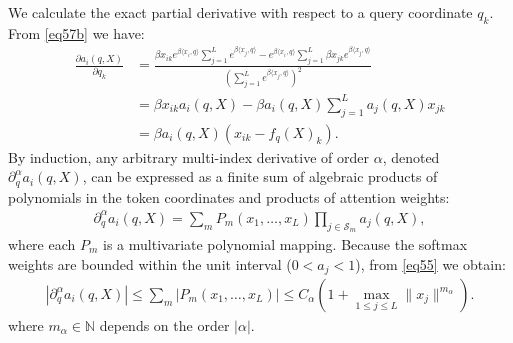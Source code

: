 \documentclass[11pt,a4paper]{article}
\theoremstyle{definition}
\begin{document}
We calculate the exact partial derivative with respect to a query coordinate $q_k$. From \eqref{eq57b} we have:
\begin{align}
\frac{\partial a_i(q, X)}{\partial q_k} &= \frac{\beta x_{ik} e^{\beta \langle x_i, q \rangle} \sum_{j=1}^L e^{\beta \langle x_j, q \rangle} - e^{\beta \langle x_i, q \rangle} \sum_{j=1}^L \beta x_{jk} e^{\beta \langle x_j, q \rangle}}{\left(\sum_{j=1}^L e^{\beta \langle x_j, q \rangle}\right)^2} \nonumber\\
&= \beta x_{ik} a_i(q, X) - \beta a_i(q, X) \sum_{j=1}^L a_j(q, X) x_{jk} \nonumber\\
&= \beta a_i(q, X) \left( x_{ik} - f_q(X)_k \right).
\end{align}
By induction, any arbitrary multi-index derivative of order $\alpha$, denoted $\partial_q^\alpha a_i(q, X)$, can be expressed as a finite sum of algebraic products of polynomials in the token coordinates and products of attention weights:
\begin{align}
\partial_q^\alpha a_i(q, X) = \sum_{m} P_m(x_1, \dots, x_L) \prod_{j \in \mathcal{S}_m} a_j(q, X) \label{eq55},
\end{align}
where each $P_m$ is a multivariate polynomial mapping. Because the softmax weights are bounded within the unit interval ($0 < a_j < 1$), from \eqref{eq55} we obtain:
\begin{align}
\left| \partial_q^\alpha a_i(q, X) \right| \le \sum_m |P_m(x_1, \dots, x_L)| \le C_\alpha \left(1 + \max_{1 \le j \le L} \|x_j\|^{m_\alpha}\right).
\end{align}
where $m_\alpha \in \mathbb{N}$ depends on the order $|\alpha|$.
\end{document}

